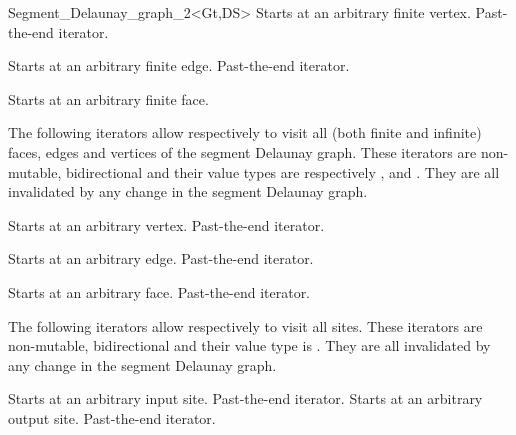 \begin{ccRefClass}{Segment_Delaunay_graph_2<Gt,DS>}
{Starts at an arbitrary finite vertex.}
\ccGlue
{}
{Past-the-end iterator.}

{Starts at an arbitrary finite edge.}
\ccGlue
{}
{Past-the-end iterator.}

{Starts at an arbitrary finite face.}
\ccGlue
{}

The following iterators allow respectively to visit all (both finite
and infinite) faces, edges and vertices of the segment Delaunay
graph. These iterators are non-mutable, bidirectional and their value
types are respectively ,  and . 
They are all invalidated by any change in the segment Delaunay graph.

{Starts at an arbitrary  vertex.}
\ccGlue
{}
{Past-the-end iterator.}

{Starts at an arbitrary edge.}
\ccGlue
{}
{Past-the-end iterator.}

{Starts at an arbitrary face.}
\ccGlue
{}
{Past-the-end iterator.}




The following iterators allow respectively to visit 
all sites. These iterators are non-mutable, bidirectional and their
value type is . They are all invalidated by any change in
the segment Delaunay graph.


{Starts at an arbitrary input site.}
\ccGlue
{}
{Past-the-end iterator.}
\ccGlue
{}
{Starts at an arbitrary output site.}
\ccGlue
{}
{Past-the-end iterator.}


\ccThreeToTwo




\end{ccRefClass}

